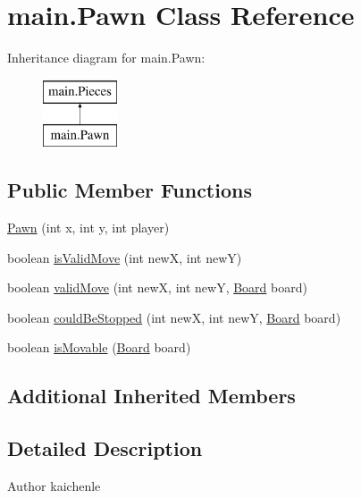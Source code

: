 \hypertarget{classmain_1_1_pawn}{}\section{main.\+Pawn Class Reference}
\label{classmain_1_1_pawn}
Inheritance diagram for main.\+Pawn\+:\begin{figure}[H]
\begin{center}
\leavevmode
\includegraphics[height=2.000000cm]{classmain_1_1_pawn}
\end{center}
\end{figure}
\subsection*{Public Member Functions}
\begin{DoxyCompactItemize}
\item 
\mbox{\hyperlink{classmain_1_1_pawn_ad6b3f84806779b0a498cccc9118b1978}{Pawn}} (int x, int y, int player)
\item 
boolean \mbox{\hyperlink{classmain_1_1_pawn_ac7b5fb5e1e8d062f479483e4c506b158}{is\+Valid\+Move}} (int newX, int newY)
\item 
boolean \mbox{\hyperlink{classmain_1_1_pawn_abf4a219aa514708a23dcf6999bf1e1e7}{valid\+Move}} (int newX, int newY, \mbox{\hyperlink{classmain_1_1_board}{Board}} board)
\item 
boolean \mbox{\hyperlink{classmain_1_1_pawn_a117c6ed884c1233e27f2a5c5f1ea379c}{could\+Be\+Stopped}} (int newX, int newY, \mbox{\hyperlink{classmain_1_1_board}{Board}} board)
\item 
boolean \mbox{\hyperlink{classmain_1_1_pawn_a54608094adc31c72a7ab0ff192a54f4d}{is\+Movable}} (\mbox{\hyperlink{classmain_1_1_board}{Board}} board)
\end{DoxyCompactItemize}
\subsection*{Additional Inherited Members}


\subsection{Detailed Description}
\begin{DoxyAuthor}{Author}
kaichenle 
\end{DoxyAuthor}


